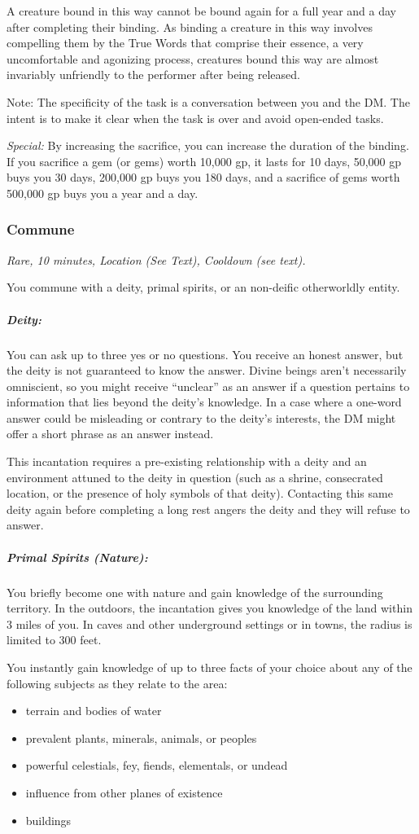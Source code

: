 A creature bound in this way cannot be bound again for a full year and a day after completing their binding. As binding a creature in this way involves compelling them by the True Words that comprise their essence, a very uncomfortable and agonizing process, creatures bound this way are almost invariably unfriendly to the performer after being released.

Note: The specificity of the task is a conversation between you and the DM. The intent is to make it clear when the task is over and avoid open-ended tasks.

\textit{Special:} By increasing the sacrifice, you can increase the duration of the binding. If you sacrifice a gem (or gems) worth 10,000 gp, it lasts for 10 days, 50,000 gp buys you 30 days, 200,000 gp buys you 180 days, and a sacrifice of gems worth 500,000 gp buys you a year and a day.

\subsubsection{Commune}
\textit{Rare, 10 minutes, Location (See Text), Cooldown (see text).}

You commune with a deity, primal spirits, or an non-deific otherworldly entity.

\subparagraph*{Deity:}  You can ask up to three yes or no questions. You receive an honest answer, but the deity is not guaranteed to know the answer. Divine beings aren't necessarily omniscient, so you might receive “unclear” as an answer if a question pertains to information that lies beyond the deity's knowledge. In a case where a one-word answer could be misleading or contrary to the deity's interests, the DM might offer a short phrase as an answer instead.

This incantation requires a pre-existing relationship with a deity and an environment attuned to the deity in question (such as a shrine, consecrated location, or the presence of holy symbols of that deity). Contacting this same deity again before completing a long rest angers the deity and they will refuse to answer.

\subparagraph*{Primal Spirits (Nature):} You briefly become one with nature and gain knowledge of the surrounding territory. In the outdoors, the incantation gives you knowledge of the land within 3 miles of you. In caves and other underground settings or in towns, the radius is limited to 300 feet.

You instantly gain knowledge of up to three facts of your choice about any of the following subjects as they relate to the area:
\begin{itemize}
\item terrain and bodies of water
\item prevalent plants, minerals, animals, or peoples
\item powerful celestials, fey, fiends, elementals, or undead
\item influence from other planes of existence
\item buildings
\end{itemize}

